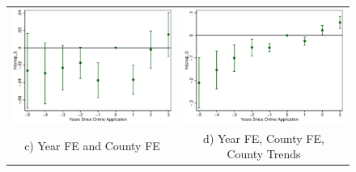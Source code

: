 \documentclass[11pt,letterpaper]{article}
\begin{document}
\begin{figure}
\begin{tabular}{cc}
\includegraphics[scale=0.57]{tabfig/evstu_snap_t_total_pop_yrcf_5_3}&\includegraphics[scale=0.57]{tabfig/evstu_snap_t_total_pop_yrcfsttr_5_3}\\
c) Year FE and County FE&d) Year FE, County FE, County Trends\\
\end{tabular}
\end{figure}
\end{document}
